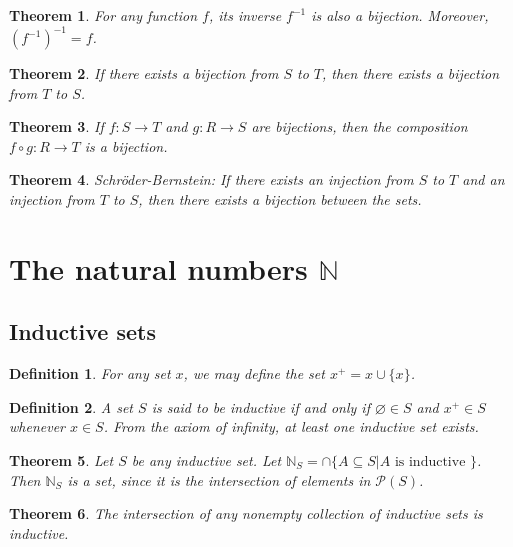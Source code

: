 \documentclass[a4paper]{article}
\newtheorem{mytheorem}{Theorem}
\newtheorem{mydef}{Definition}
\numberwithin{mytheorem}{section}
\numberwithin{mydef}{section}
\numberwithin{axiom}{section}
\numberwithin{example}{section}
\begin{document}
\begin{mytheorem} For any function $f$, its inverse $f^{-1}$ is also a bijection. Moreover, $(f^{-1})^{-1} = f$. \end{mytheorem}

\begin{mytheorem} If there exists a bijection from $S$ to $T$, then there exists a bijection from $T$ to $S$. \end{mytheorem}

\begin{mytheorem} If $f: S \rightarrow T$ and $g: R \rightarrow S$ are bijections, then the composition $f \circ g: R \rightarrow T$ is a bijection.
\end{mytheorem}

\begin{mytheorem} Schr{\"o}der-Bernstein: If there exists an injection from $S$ to $T$ and an injection from $T$ to $S$, then there exists a bijection between the sets. \end{mytheorem}
\section{The natural numbers $\mathbb{N}$}

\subsection{Inductive sets}

\begin{mydef} For any set $x$, we may define the set $x^{+} = x \cup \{ x \} $. 
\end{mydef}

\begin{mydef} A set $S$ is said to be inductive if and only if $\varnothing \in S$ and $x^{+} \in S$ whenever $x \in S$. From the axiom of infinity, at least one inductive set exists.
\end{mydef}

\begin{mytheorem} Let $S$ be any inductive set. Let $\mathbb{N}_{S} = \cap \{ A \subseteq S | A \text{ is inductive } \} $. Then $\mathbb{N}_{S}$ is a set, since it is the intersection of elements in $\mathcal{P}(S)$.
\end{mytheorem}

\begin{mytheorem} The intersection of any nonempty collection of inductive sets is inductive.
\end{mytheorem}
\end{document}
